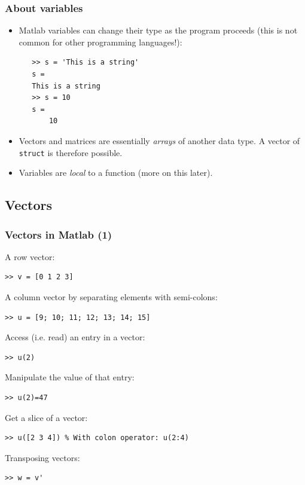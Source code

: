 \documentclass[11pt,table,final,fleqn,xcolor={usenames,dvipsnames},unknownkeysallowed,handout]{beamer}
\begin{document}
   \begin{frame}[fragile]
    \frametitle{About variables}
    \begin{itemize}
      \item Matlab variables can change their type as the program proceeds (this is not common for other programming languages!):
      \begin{lstlisting}
   >> s = 'This is a string'
   s =
   This is a string
   >> s = 10
   s =
       10
   \end{lstlisting}
       \item Vectors and matrices are essentially \emph{arrays} of another data type. A vector of \lstinline$struct$ is therefore possible.
       \item Variables are \emph{local} to a function (more on this later).
   \end{itemize}
   \end{frame}

\subsection*{Vectors}
\begin{frame}[fragile]
  \frametitle{Vectors in Matlab (1)}
  A row vector:
  \begin{lstlisting}
>> v = [0 1 2 3]
  \end{lstlisting}\pause
  A column vector by separating elements with semi-colons:
  \begin{lstlisting}
>> u = [9; 10; 11; 12; 13; 14; 15]
  \end{lstlisting}\pause
  Access (i.e. read) an entry in a vector:
  \begin{lstlisting}
>> u(2)
  \end{lstlisting}\pause
  Manipulate the value of that entry:
  \begin{lstlisting}
>> u(2)=47
  \end{lstlisting}\pause
  Get a slice of a vector:
  \begin{lstlisting}
>> u([2 3 4]) % With colon operator: u(2:4)
  \end{lstlisting}\pause
  Transposing vectors:
  \begin{lstlisting}
>> w = v'
  \end{lstlisting}
\end{frame}
\end{document}
